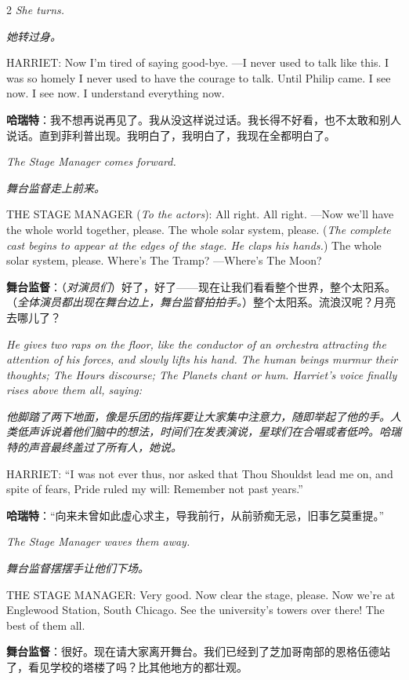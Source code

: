 \documentclass[lang=cn,newtx,10pt,scheme=chinese]{elegantbook}
\newcommand{\pair}[2]{%
\switchcolumn* #2\par
\switchcolumn  #1\par
}
\begin{document}
\begin{paracol}{2}
\pair{
    \textit{她转过身。}
}{
    \textit{She turns.}
    \newline
}

\pair{
    \textbf{哈瑞特}：我不想再说再见了。我从没这样说过话。我长得不好看，也不太敢和别人说话。直到菲利普出现。我明白了，我明白了，我现在全都明白了。
}{
    HARRIET: Now I'm tired of saying good-bye. —I never used to talk like this. I was so homely I never used to have the courage to talk. Until Philip came. I see now. I see now. I understand everything now.
    \newline
}

\pair{
    \textit{舞台监督走上前来。}
}{
    \textit{The Stage Manager comes forward.}
    \newline
}

\pair{
    \textbf{舞台监督}：（\textit{对演员们}）好了，好了——现在让我们看看整个世界，整个太阳系。（\textit{全体演员都出现在舞台边上，舞台监督拍拍手。}）整个太阳系。流浪汉呢？月亮去哪儿了？
}{
    THE STAGE MANAGER (\textit{To the actors}): All right. All right. —Now we'll have the whole world together, please. The whole solar system, please. (\textit{The complete cast begins to appear at the edges of the stage. He claps his hands.}) The whole solar system, please. Where's The Tramp? —Where's The Moon?
    \newline
}

\pair{
    \textit{他脚踏了两下地面，像是乐团的指挥要让大家集中注意力，随即举起了他的手。人类低声诉说着他们脑中的想法，时间们在发表演说，星球们在合唱或者低吟。哈瑞特的声音最终盖过了所有人，她说。}
}{
    \textit{He gives two raps on the floor, like the conductor of an orchestra attracting the attention of his forces, and slowly lifts his hand. The human beings murmur their thoughts; The Hours discourse; The Planets chant or hum. Harriet’s voice finally rises above them all, saying:}
    \newline
}

\pair{
    \textbf{哈瑞特}：“向来未曾如此虚心求主，导我前行，从前骄痴无忌，旧事乞莫重提。”
}{
    HARRIET: “I was not ever thus, nor asked that Thou Shouldst lead me on, and spite of fears, Pride ruled my will: Remember not past years.”
    \newline
}

\pair{
    \textit{舞台监督摆摆手让他们下场。}
}{
    \textit{The Stage Manager waves them away.}
    \newline
}

\pair{
    \textbf{舞台监督}：很好。现在请大家离开舞台。我们已经到了芝加哥南部的恩格伍德站了，看见学校的塔楼了吗？比其他地方的都壮观。
}{
    THE STAGE MANAGER: Very good. Now clear the stage, please. Now we're at Englewood Station, South Chicago. See the university's towers over there! The best of them all.
}


\end{paracol}
\end{document}
